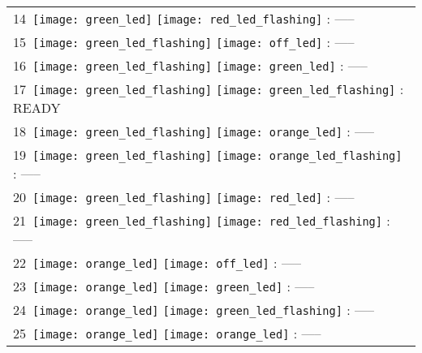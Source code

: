 \documentclass[12pt, a4paper]{report}
\begin{document}
\begin{minipage}{0.45\textwidth}
\begin{Large}
\begin{tabular}{l}
		14\  \texttt{[image: green\_led]} \texttt{[image: red\_led\_flashing]} : -----\\
		
		15\  \texttt{[image: green\_led\_flashing]} \texttt{[image: off\_led]} : -----\\
		
		16\  \texttt{[image: green\_led\_flashing]} \texttt{[image: green\_led]} : -----\\
		
		17\  \texttt{[image: green\_led\_flashing]} \texttt{[image: green\_led\_flashing]} : READY\\
		
		18\  \texttt{[image: green\_led\_flashing]} \texttt{[image: orange\_led]} : -----\\
		
		19\  \texttt{[image: green\_led\_flashing]} \texttt{[image: orange\_led\_flashing]} : -----\\
		
		20\  \texttt{[image: green\_led\_flashing]} \texttt{[image: red\_led]} : -----\\
		
		21\  \texttt{[image: green\_led\_flashing]} \texttt{[image: red\_led\_flashing]} : -----\\
		
		22\  \texttt{[image: orange\_led]} \texttt{[image: off\_led]} : -----\\
		
		23\  \texttt{[image: orange\_led]} \texttt{[image: green\_led]} : -----\\
		
		24\  \texttt{[image: orange\_led]} \texttt{[image: green\_led\_flashing]} : -----\\
		
		25\  \texttt{[image: orange\_led]} \texttt{[image: orange\_led]} : -----\\
	\end{tabular}
	\end{Large}
	\end{minipage}%
\end{document}
